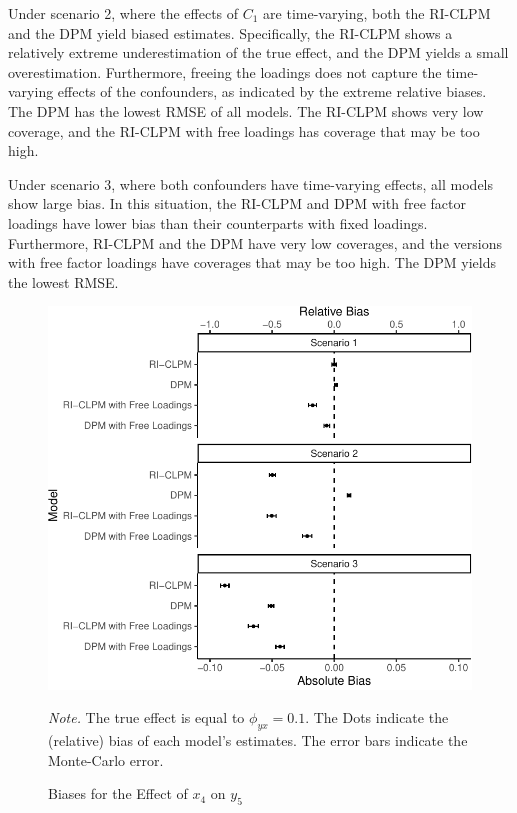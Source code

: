 \documentclass[
  a4paper,
  stu,
  floatsintext,
  donotrepeattitle]{apa7}
\begin{document}
Under scenario 2, where the effects of \(C_1\) are time-varying, both
the RI-CLPM and the DPM yield biased estimates. Specifically, the
RI-CLPM shows a relatively extreme underestimation of the true effect,
and the DPM yields a small overestimation. Furthermore, freeing the
loadings does not capture the time-varying effects of the confounders,
as indicated by the extreme relative biases. The DPM has the lowest RMSE
of all models. The RI-CLPM shows very low coverage, and the RI-CLPM with
free loadings has coverage that may be too high.

Under scenario 3, where both confounders have time-varying effects, all
models show large bias. In this situation, the RI-CLPM and DPM with free
factor loadings have lower bias than their counterparts with fixed
loadings. Furthermore, RI-CLPM and the DPM have very low coverages, and
the versions with free factor loadings have coverages that may be too
high. The DPM yields the lowest RMSE.

\begin{figure}

\caption{\label{fig-biases}Biases for the Effect of \(x_4\) on \(y_5\)}

{\centering 

\includegraphics{research-report_files/figure-pdf/plot-bias-1.pdf}

\begin{flushleft}
\emph{Note.} The true effect is equal to \(\phi_{yx} = 0.1\). The Dots
indicate the (relative) bias of each model's estimates. The error bars
indicate the Monte-Carlo error.

\end{flushleft}

}

\end{figure}
\end{document}
